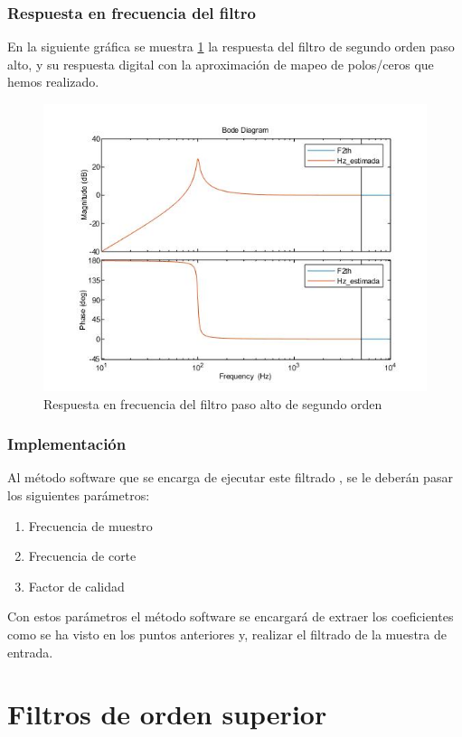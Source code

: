 \documentclass[titlepage]{article}
\begin{document}
\subsubsection{Respuesta en frecuencia del filtro}
En la siguiente gráfica se muestra \ref{fig:highpassdiscrete} la respuesta del filtro de segundo orden paso alto, y su respuesta digital con la aproximación de mapeo de polos/ceros que hemos realizado. 
\begin{figure}[H]
  \centering
	\includegraphics[scale=0.5]{highpassdiscrete}
  \caption{Respuesta en frecuencia del filtro paso alto de segundo orden}
  \label{fig:highpassdiscrete}
\end{figure}

\subsubsection{Implementación}
Al método software que se encarga de ejecutar este filtrado , se le deberán pasar los siguientes parámetros:
\begin{enumerate}
\item Frecuencia de muestro 
\item Frecuencia de corte
\item Factor de calidad
\end{enumerate}
Con estos parámetros el método software se encargará de extraer los coeficientes como se ha visto en los puntos anteriores y, realizar el filtrado de la muestra de entrada.


\section{Filtros de orden superior}
\end{document}
